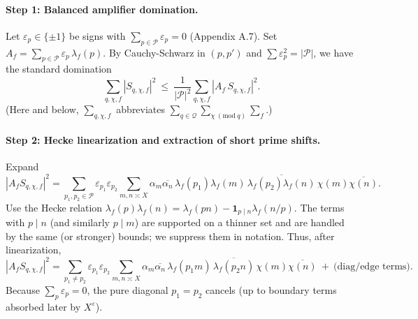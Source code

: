 \documentclass[11pt]{article}
\theoremstyle{definition}
\theoremstyle{remark}
\numberwithin{equation}{part}
\begin{document}
\paragraph{Step 1: Balanced amplifier domination.}
Let $\varepsilon_p\in\{\pm 1\}$ be signs with $\sum_{p\in\mathcal P}\varepsilon_p=0$ (Appendix A.7).
Set $A_f=\sum_{p\in\mathcal P}\varepsilon_p\,\lambda_f(p)$.
By Cauchy-Schwarz in $(p,p')$ and $\sum\varepsilon_p^2=|\mathcal P|$, we have the standard domination
\begin{equation}\label{eq:amp-dom}
	\sum_{q,\chi,f}|S_{q,\chi,f}|^2
	\ \le\ \frac{1}{|\mathcal P|^2}\sum_{q,\chi,f}|A_f\,S_{q,\chi,f}|^2.
\end{equation}
(Here and below, $\sum_{q,\chi,f}$ abbreviates $\sum_{q\in\mathcal Q}\sum_{\chi\ (\mathrm{mod}\ q)}\sum_f$.)

\paragraph{Step 2: Hecke linearization and extraction of short prime shifts.}
Expand
\[
	|A_f S_{q,\chi,f}|^2
	=\sum_{p_1,p_2\in\mathcal P}\varepsilon_{p_1}\varepsilon_{p_2}
	\sum_{m,n\asymp X}\alpha_m\overline{\alpha_n}\,
	\lambda_f(p_1)\lambda_f(m)\,\overline{\lambda_f(p_2)\lambda_f(n)}\,\chi(m)\overline{\chi(n)}.
\]
Use the Hecke relation $\lambda_f(p)\lambda_f(n)=\lambda_f(pn)-\mathbf 1_{p\mid n}\lambda_f(n/p)$.
The terms with $p\mid n$ (and similarly $p\mid m$) are supported on a thinner set and are handled by the same (or stronger) bounds; we suppress them in notation.
Thus, after linearization,
\[
	|A_f S_{q,\chi,f}|^2
	= \sum_{p_1\ne p_2}\varepsilon_{p_1}\varepsilon_{p_2}
	\!\!\sum_{m,n\asymp X}\!\alpha_m\overline{\alpha_n}\,
	\lambda_f(p_1 m)\,\overline{\lambda_f(p_2 n)}\,\chi(m)\overline{\chi(n)}
	\ +\ \text{(diag/edge terms)}.
\]
Because $\sum_{p}\varepsilon_p=0$, the pure diagonal $p_1=p_2$ cancels (up to boundary terms absorbed later by $X^\varepsilon$).
\end{document}
